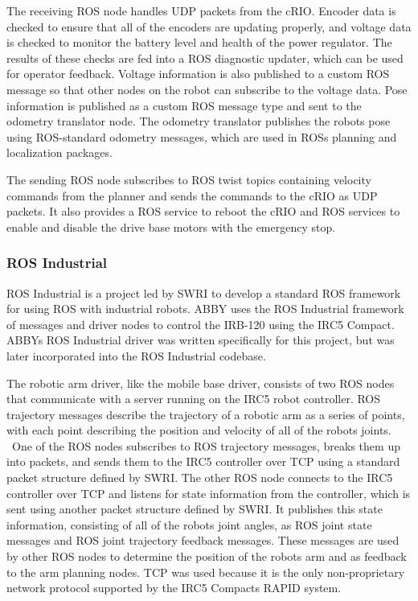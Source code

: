 \documentclass{article}
\begin{document}
The receiving ROS node handles UDP packets from the cRIO. Encoder data is checked to ensure that all of the encoders are updating properly, and voltage data is checked to monitor the battery level and health of the power regulator. The results of these checks are fed into a ROS diagnostic updater, which can be used for operator feedback. Voltage information is also published to a custom ROS message so that other nodes on the robot can subscribe to the voltage data. Pose information is published as a custom ROS message type and sent to the odometry translator node. The odometry translator publishes the robot{\textquotesingle}s pose using ROS-standard odometry messages, which are used in ROS{\textquotesingle}s planning and localization packages.

The sending ROS node subscribes to ROS {\textquotedbl}twist{\textquotedbl} topics containing velocity commands from the planner and sends the commands to the cRIO as UDP packets. It also provides a ROS service to reboot the cRIO and ROS services to enable and disable the drive base motors with the emergency stop.

\subsubsection{ROS Industrial}
ROS Industrial is a project led by SWRI to develop a standard ROS framework for using ROS with industrial robots.\cite{ros-industrial} ABBY uses the ROS Industrial framework of messages and driver nodes to control the IRB-120 using the IRC5 Compact. ABBY{\textquotesingle}s ROS Industrial driver was written specifically for this project, but was later incorporated into the ROS Industrial codebase.

The robotic arm driver, like the mobile base driver, consists of two ROS nodes that communicate with a server running on the IRC5 robot controller. ROS trajectory messages describe the trajectory of a robotic arm as a series of points, with each point describing the position and velocity of all of the robot{\textquotesingle}s joints. \ One of the ROS nodes subscribes to ROS trajectory messages, breaks them up into packets, and sends them to the IRC5 controller over TCP using a standard packet structure defined by SWRI. The other ROS node connects to the IRC5 controller over TCP and listens for state information from the controller, which is sent using another packet structure defined by SWRI. It publishes this state information, consisting of all of the robot{\textquotesingle}s joint angles, as ROS joint state messages and ROS joint trajectory feedback messages. These messages are used by other ROS nodes to determine the position of the robot{\textquotesingle}s arm and as feedback to the arm planning nodes. TCP was used because it is the only non-proprietary network protocol supported by the IRC5 Compact{\textquotesingle}s RAPID system.
\end{document}
